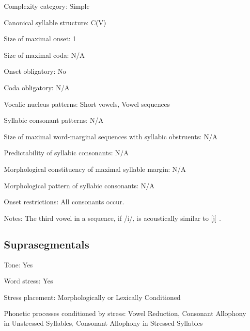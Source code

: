 {\begin{appendixdesc}
\item[Complexity category:] Simple

\item[Canonical syllable structure:] C(V) \citep[163--167]{Chacon2012}

\item[Size of maximal onset:] 1

\item[Size of maximal coda:] N/A

\item[Onset obligatory:] No

\item[Coda obligatory:] N/A

\item[Vocalic nucleus patterns:] Short vowels, Vowel sequences

\item[Syllabic consonant patterns:] N/A

\item[Size of maximal word-marginal sequences with syllabic obstruents:] N/A

\item[Predictability of syllabic consonants:] N/A

\item[Morphological constituency of maximal syllable margin:] N/A

\item[Morphological pattern of syllabic consonants:] N/A

\item[Onset restrictions:] All consonants occur.

\item[Notes:] The third vowel in a sequence, if /i/, is acoustically similar to [j] \citep[52]{Chacon2012}.
\end{appendixdesc}
\subsection*{Suprasegmentals}
\begin{appendixdesc}
\item[Tone:] Yes

\item[Word stress:] Yes

\item[Stress placement:] Morphologically or Lexically Conditioned

\item[Phonetic processes conditioned by stress:] Vowel Reduction, Consonant Allophony in Unstressed Syllables, Consonant Allophony in Stressed Syllables


\end{appendixdesc}}
